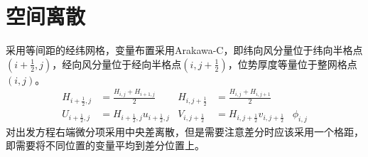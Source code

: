 \documentclass{ctexart}
\begin{document}
\section{空间离散}
采用等间距的经纬网格，变量布置采用Arakawa-C，即纬向风分量位于纬向半格点$\left( i + \frac{1}{2}, j \right)$，经向风分量位于经向半格点$\left( i, j + \frac{1}{2} \right)$，位势厚度等量位于整网格点$\left( i, j \right)$。
\begin{align}
  H_{i+\frac{1}{2},j} & = \frac{H_{i,j} + H_{i+1,j}}{2} & H_{i,j+\frac{1}{2}} & = \frac{H_{i,j} + H_{i,j+1}}{2} \nonumber \\
  U_{i+\frac{1}{2},j} & = H_{i+\frac{1}{2},j} u_{i+\frac{1}{2},j} & V_{i,j+\frac{1}{2}} & = H_{i,j+\frac{1}{2}} v_{i,j+\frac{1}{2}} & \phi_{i,j} \nonumber
\end{align}
对出发方程右端微分项采用中央差离散，但是需要注意差分时应该采用一个格距，即需要将不同位置的变量平均到差分位置上。
\end{document}
